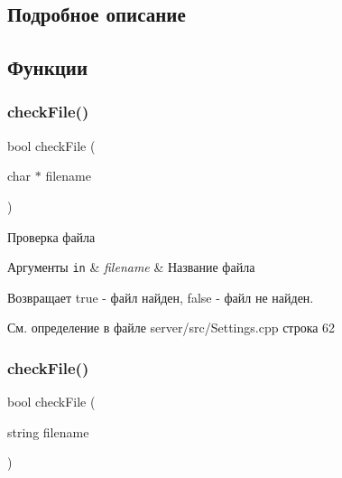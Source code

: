 \subsection{Подробное описание}


\subsection{Функции}
\mbox{\label{group__settingscpp_ga2dd1bc039652a0480c444957d416b6a6}} 
\subsubsection{\texorpdfstring{check\+File()}{checkFile()}\hspace{0.1cm}{\footnotesize\ttfamily [1/2]}}
{\footnotesize\ttfamily bool check\+File (\begin{DoxyParamCaption}\item[{char $\ast$}]{filename }\end{DoxyParamCaption})}



Проверка файла 


\begin{DoxyParams}[1]{Аргументы}
\mbox{\tt in}  & {\em filename} & Название файла \\
\hline
\end{DoxyParams}
\begin{DoxyReturn}{Возвращает}
true -\/ файл найден, false -\/ файл не найден. 
\end{DoxyReturn}


См. определение в файле server/src/\+Settings.\+cpp строка 62

\mbox{\label{group__settingscpp_ga64f8c9899c815dc180b2b564c0d05762}} 
\subsubsection{\texorpdfstring{check\+File()}{checkFile()}\hspace{0.1cm}{\footnotesize\ttfamily [2/2]}}
{\footnotesize\ttfamily bool check\+File (\begin{DoxyParamCaption}\item[{string}]{filename }\end{DoxyParamCaption})}



